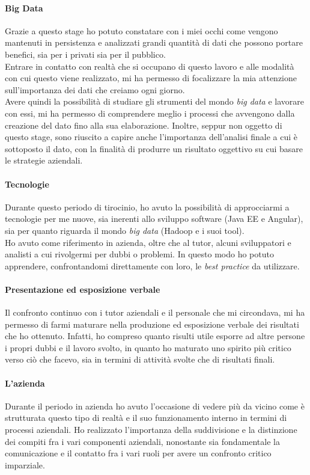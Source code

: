 \paragraph{Big Data}
Grazie a questo stage ho potuto constatare con i miei occhi come vengono mantenuti in persistenza e analizzati grandi quantità di dati che possono portare benefici, sia per i privati sia per il pubblico. \\
Entrare in contatto con realtà che si occupano di questo lavoro e alle modalità con cui questo viene realizzato, mi ha permesso di focalizzare la mia attenzione sull'importanza dei dati che creiamo ogni giorno. \\
Avere quindi la possibilità di studiare gli strumenti del mondo \textit{big data} e lavorare con essi, mi ha permesso di comprendere meglio i processi che avvengono dalla creazione del dato fino alla sua elaborazione. Inoltre, seppur non oggetto di questo stage, sono riuscito a capire anche l'importanza dell'analisi finale a cui è sottoposto il dato, con la finalità di produrre un risultato oggettivo su cui basare le strategie aziendali.  

\paragraph{Tecnologie}
Durante questo periodo di tirocinio, ho avuto la possibilità di approcciarmi a tecnologie per me nuove, sia inerenti allo sviluppo software (Java EE e Angular), sia per quanto riguarda il mondo \textit{big data} (Hadoop e i suoi tool). \\
Ho avuto come riferimento in azienda, oltre che al tutor, alcuni sviluppatori e analisti a cui rivolgermi per dubbi o problemi. In questo modo ho potuto apprendere, confrontandomi direttamente con loro, le \textit{best practice} da utilizzare.

\paragraph{Presentazione ed esposizione verbale}
Il confronto continuo con i tutor aziendali e il personale che mi circondava, mi ha permesso di farmi maturare nella produzione ed esposizione verbale dei risultati che ho ottenuto. Infatti, ho compreso quanto risulti utile esporre ad altre persone i propri dubbi e il lavoro svolto, in quanto ho maturato uno spirito più critico verso ciò che facevo, sia in termini di attività svolte che di risultati finali.

\paragraph{L'azienda}
Durante il periodo in azienda ho avuto l'occasione di vedere più da vicino come è strutturata questo tipo di realtà e il suo funzionamento interno in termini di processi aziendali. Ho realizzato l'importanza della suddivisione e la distinzione dei compiti fra i vari componenti aziendali, nonostante sia fondamentale la comunicazione e il contatto fra i vari ruoli per avere un confronto critico imparziale.

